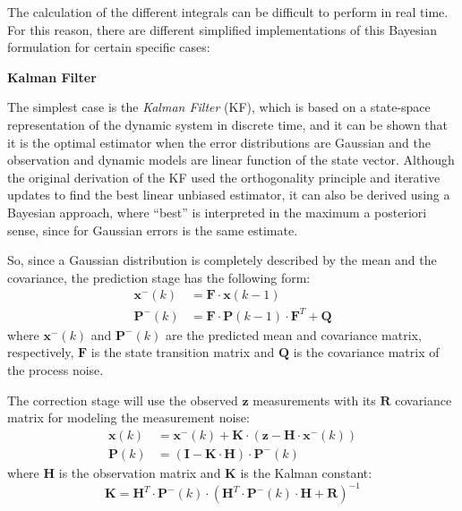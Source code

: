 The calculation of the different integrals can be difficult to perform in real time. For this reason, there are different simplified implementations of this Bayesian formulation for certain specific cases:
\begin{description}
	\item \textbf{Kalman Filter}

	The simplest case is the \emph{Kalman Filter} (KF), which is based on a state-space representation of the dynamic system in discrete time, and it can be shown that it is the optimal estimator when the error distributions are Gaussian and the observation and dynamic models are linear function of the state vector.
	Although the original derivation of the KF used the orthogonality principle and iterative updates to find the best linear unbiased estimator, it can also be derived using a Bayesian approach, where ``best'' is interpreted in the maximum a posteriori sense, since for Gaussian errors is the same estimate.
	
	So, since a Gaussian distribution is completely described by the mean and the covariance, the prediction stage has the following form:
	\begin{equation} %
	\label{eqn_KF_pred}
		\begin{aligned}
			\boldsymbol{x}^{-}(k)&=\boldsymbol{F} \cdot \boldsymbol{x}(k-1)\\
			\boldsymbol{P}^{-}(k)&=\boldsymbol{F} \cdot \boldsymbol{P}(k-1) \cdot \boldsymbol{F}^T+\boldsymbol{Q}
		\end{aligned}
	\end{equation}		
	where $\boldsymbol{x}^{-}(k)$ and $\boldsymbol{P}^{-}(k)$ are the predicted mean and covariance matrix, respectively, $\boldsymbol{F}$ is the state transition matrix and $\boldsymbol{Q}$ is the covariance matrix of the process noise.
	
	The correction stage will use the observed $\boldsymbol{z}$ measurements with its $\boldsymbol{R}$ covariance matrix for modeling the measurement noise:
	\begin{equation} %
	\label{eqn_KF_corr}
		\begin{aligned}
			\boldsymbol{x}(k)&=\boldsymbol{x}^{-}(k)+\boldsymbol{K}\cdot (\boldsymbol{z}-\boldsymbol{H}\cdot \boldsymbol{x}^{-}(k))\\
			\boldsymbol{P}(k)&=(\boldsymbol{I}-\boldsymbol{K}\cdot\boldsymbol{H})\cdot \boldsymbol{P}^{-}(k)
		\end{aligned}
	\end{equation}		
	where $\boldsymbol{H}$ is the observation matrix and $\boldsymbol{K}$ is the Kalman constant:
	\begin{equation}
	\label{eqn_KF_K}
		\boldsymbol{K}=\boldsymbol{H}^T \cdot \boldsymbol{P}^{-}(k) \cdot (\boldsymbol{H}^T  \cdot \boldsymbol{P}^{-}(k) \cdot \boldsymbol{H}+\boldsymbol{R})^{-1}
	\end{equation}		
	

\end{description}
